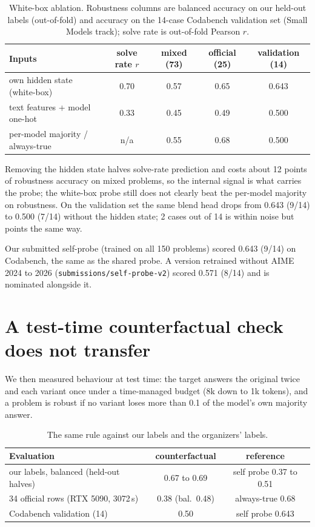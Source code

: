 \documentclass{article}
\newcommand{\BBVAL}{0.500}
\begin{document}
\begin{table}[h]
  \caption{White-box ablation. Robustness columns are balanced accuracy on our held-out labels (out-of-fold) and accuracy on the 14-case Codabench validation set (Small Models track); solve rate is out-of-fold Pearson $r$.}
  \label{tab:ablation}
  \centering
  \small
  \begin{tabular}{lcccc}
    \toprule
    Inputs & solve rate $r$ & mixed (73) & official (25) & validation (14) \\
    \midrule
    own hidden state (white-box) & 0.70 & 0.57 & 0.65 & 0.643 \\
    text features + model one-hot & 0.33 & 0.45 & 0.49 & \BBVAL \\
    per-model majority / always-true & n/a & 0.55 & 0.68 & 0.500 \\
    \bottomrule
  \end{tabular}
\end{table}

Removing the hidden state halves solve-rate prediction and costs about 12 points of robustness accuracy on mixed problems, so the internal signal is what carries the probe; the white-box probe still does not clearly beat the per-model majority on robustness. On the validation set the same blend head drops from 0.643 (9/14) to 0.500 (7/14) without the hidden state; 2 cases out of 14 is within noise but points the same way.

Our submitted self-probe (trained on all 150 problems) scored 0.643 (9/14) on Codabench, the same as the shared probe. A version retrained without AIME 2024 to 2026 (\texttt{submissions/self-probe-v2}) scored 0.571 (8/14) and is nominated alongside it.

\section{A test-time counterfactual check does not transfer}
We then measured behaviour at test time: the target answers the original twice and each variant once under a time-managed budget (8k down to 1k tokens), and a problem is robust if no variant loses more than 0.1 of the model's own majority answer.

\begin{table}[h]
  \caption{The same rule against our labels and the organizers' labels.}
  \label{tab:cf}
  \centering
  \small
  \begin{tabular}{lcc}
    \toprule
    Evaluation & counterfactual & reference \\
    \midrule
    our labels, balanced (held-out halves) & 0.67 to 0.69 & self probe 0.37 to 0.51 \\
    34 official rows (RTX 5090, 3072\,s) & 0.38 (bal.\ 0.48) & always-true 0.68 \\
    Codabench validation (14) & 0.50 & self probe 0.643 \\
    \bottomrule
  \end{tabular}
\end{table}
\end{document}
